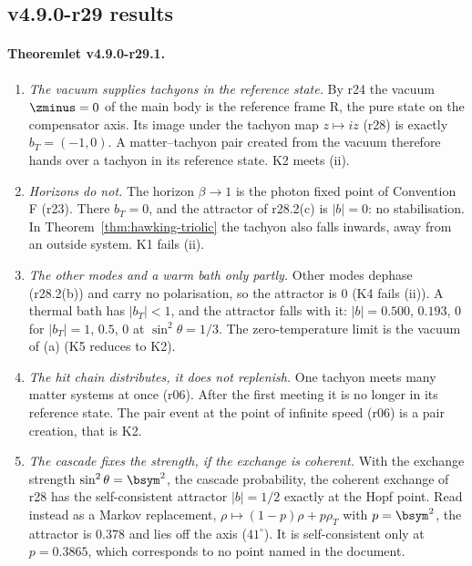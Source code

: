 \subsection*{v4.9.0-r29 results}
\label{subsec:v490-r29-results}

\paragraph{Theoremlet v4.9.0-r29.1.}
\begin{enumerate}[leftmargin=2em]
\item[(a)] \emph{The vacuum supplies tachyons in the reference state.}  By r24 the vacuum \(\zminus=0\) of the main body is the reference
frame R, the pure state on the compensator axis.  Its image under the tachyon map \(z\mapsto iz\) (r28) is exactly \(b_T=(-1,0)\).  A
matter--tachyon pair created from the vacuum therefore hands over a tachyon in its reference state.  K2 meets (ii).
\item[(b)] \emph{Horizons do not.}  The horizon \(\beta\to1\) is the photon fixed point of Convention F (r23).  There \(b_T=0\), and the
attractor of r28.2(c) is \(|b|=0\): no stabilisation.  In Theorem~\ref{thm:hawking-triolic} the tachyon also falls inwards, away
from an outside system.  K1 fails (ii).
\item[(c)] \emph{The other modes and a warm bath only partly.}  Other modes dephase (r28.2(b)) and carry no polarisation, so the attractor
is \(0\) (K4 fails (ii)).  A thermal bath has \(|b_T|<1\), and the attractor falls with it: \(|b|=0.500\), \(0.193\), \(0\) for
\(|b_T|=1\), \(0.5\), \(0\) at \(\sin^2\theta=1/3\).  The zero-temperature limit is the vacuum of (a) (K5 reduces to K2).
\item[(d)] \emph{The hit chain distributes, it does not replenish.}  One tachyon meets many matter systems at once (r06).  After the
first meeting it is no longer in its reference state.  The pair event at the point of infinite speed (r06) is a pair creation,
that is K2.
\item[(e)] \emph{The cascade fixes the strength, if the exchange is coherent.}  With the exchange strength \(\sin^2\theta=\bsym^2\), the
cascade probability, the coherent exchange of r28 has the self-consistent attractor \(|b|=1/2\) exactly at the Hopf point.  Read
instead as a Markov replacement, \(\rho\mapsto(1-p)\rho+p\rho_T\) with \(p=\bsym^2\), the attractor is \(0.378\) and lies off the axis
(\(41^\circ\)).  It is self-consistent only at \(p=0.3865\), which corresponds to no point named in the document.
\end{enumerate}

